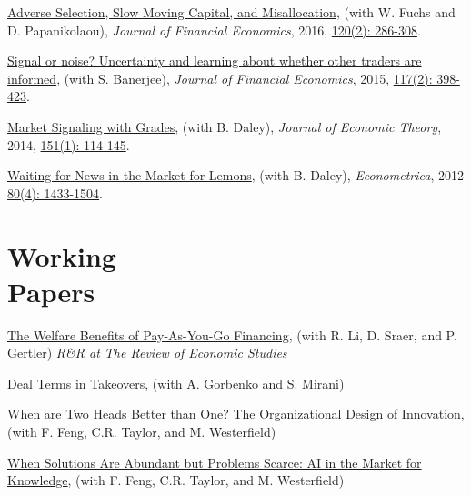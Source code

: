 \documentclass[margin,line,11pt]{resume}
\begin{document}
\begin{resume}
    \href{http://papers.ssrn.com/sol3/papers.cfm?abstract_id=2337329}{Adverse Selection, Slow Moving Capital, and Misallocation},  (with W. Fuchs and D. Papanikolaou), \emph{Journal of Financial Economics}, 2016, \href{https://www.sciencedirect.com/science/article/pii/S0304405X16000027}{120(2): 286-308}.








    \href{http://papers.ssrn.com/sol3/papers.cfm?abstract_id=2139771}{Signal or noise? Uncertainty and learning about whether other traders are informed}, (with S. Banerjee), \emph{Journal of Financial Economics}, 2015, \href{https://www.sciencedirect.com/science/article/pii/S0304405X15000744}{117(2): 398-423}.
 


 \href{http://papers.ssrn.com/sol3/papers.cfm?abstract_id=1532846}{Market Signaling with Grades}, (with B. Daley), \emph{Journal of Economic Theory}, 2014, \href{https://www.sciencedirect.com/science/article/pii/S0022053113001804}{151(1): 114-145}.



 \href{http://papers.ssrn.com/sol3/papers.cfm?abstract_id=1830234}{Waiting for News in the Market for Lemons}, (with B. Daley), \emph{Econometrica}, 2012 \href{https://onlinelibrary.wiley.com/doi/abs/10.3982/ECTA9278}{80(4): 1433-1504}.




\section{\mysidestyle Working \\
 Papers }




  \href{https://papers.ssrn.com/sol3/papers.cfm?abstract_id=4641559}{The Welfare Benefits of Pay-As-You-Go Financing}, (with R. Li, D. Sraer, and P. Gertler) \emph{R\&R at The Review of Economic Studies}

  Deal Terms in Takeovers, (with A. Gorbenko and S. Mirani)

  \href{https://papers.ssrn.com/sol3/papers.cfm?abstract_id=7480300}{When are Two Heads Better than One? The Organizational Design of Innovation}, (with F. Feng, C.R. Taylor, and M. Westerfield)

  \href{https://papers.ssrn.com/sol3/papers.cfm?abstract_id=7479738}{When Solutions Are Abundant but Problems Scarce: AI in the Market for Knowledge}, (with F. Feng, C.R. Taylor, and M. Westerfield)


\end{resume}
\end{document}

